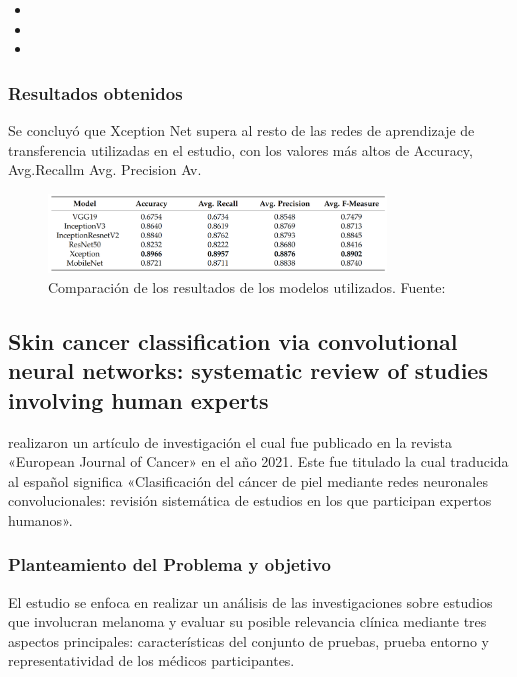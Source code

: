 \begin{itemize}
	\item \TIDLone
	\item \TIDLtwo
	\item \TIDLthree
\end{itemize}


\subsubsection{Resultados obtenidos}
Se concluyó que Xception Net supera al resto de las redes de aprendizaje de transferencia utilizadas en el estudio, con los valores más altos de Accuracy, Avg.Recallm Avg. Precision Av.

\begin{figure}[h]
	\begin{center}
		\includegraphics[width=0.8\textwidth]{2/figuras/Deep_Learning_Based_Transfer_Learning_imagen_01.png}
		\caption{Comparación de los resultados de los modelos utilizados. Fuente: \cite{jain2021deep}}
		\label{1:fig 3}
	\end{center}
\end{figure}






\subsection{Skin cancer classification via convolutional neural networks: systematic review of studies involving human experts \citep*{haggenmuller2021skin}}
\citeauthor{haggenmuller2021skin} realizaron un artículo de investigación el cual fue publicado en la revista «European Journal of Cancer» en el año 2021. Este fue titulado  la cual traducida al español significa «Clasificación del cáncer de piel mediante redes neuronales convolucionales: revisión sistemática de estudios en los que participan expertos humanos».

\subsubsection{Planteamiento del Problema y objetivo}
El estudio se enfoca en realizar un análisis de las investigaciones sobre estudios que involucran melanoma y evaluar su posible relevancia clínica mediante tres aspectos principales: características del conjunto de pruebas, prueba entorno y representatividad de los médicos participantes.


